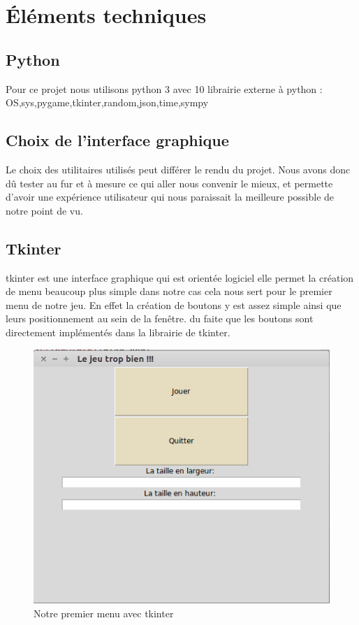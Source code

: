 \documentclass[a4paper, 11pt]{article}
\begin{document}
\section{Éléments techniques}

\subsection{Python}

Pour ce projet nous utilisons python 3 avec 10 librairie externe à python :
OS,sys,pygame,tkinter,random,json,time,sympy

\subsection{Choix de l'interface graphique}

Le choix des utilitaires utilisés peut différer le rendu du projet. Nous avons donc dû tester au fur et à mesure ce qui aller nous convenir le mieux, et permette d'avoir une expérience utilisateur qui nous paraissait la meilleure possible de notre point de vu.

\subsection{Tkinter}
tkinter est une interface graphique qui est orientée logiciel elle permet la création de menu beaucoup plus simple dans notre cas cela nous sert pour le premier menu de notre jeu. En effet la création de boutons y est assez simple ainsi que leurs positionnement au sein de la fenêtre. du faite que les boutons sont directement implémentés dans la librairie de tkinter.
 \begin{figure}[ht!]
 \centering
 \includegraphics[width=0.7\linewidth]{tkinter.png}
 \caption{Notre premier menu avec tkinter}
 \label{fig::example::one}
\end{figure}
\end{document}
